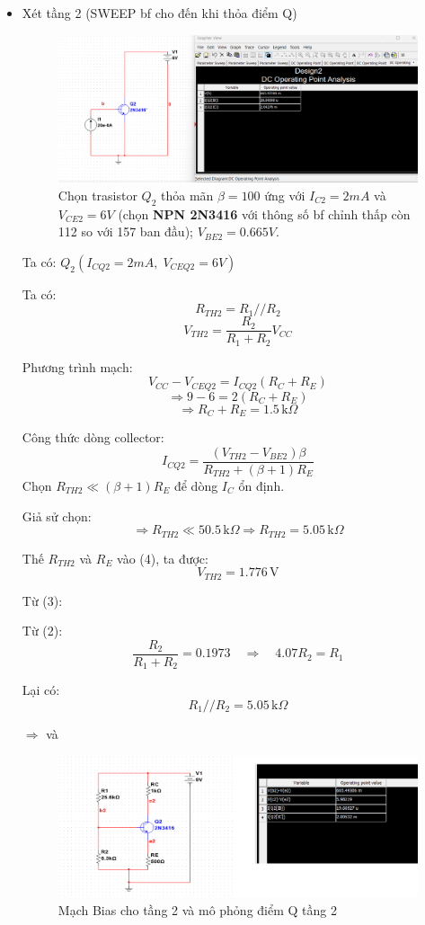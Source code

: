\begin{itemize}[label=-]
\item Xét tầng 2 (SWEEP bf cho đến khi thỏa điểm Q)

\begin{figure}[H]
	\centering
	\includegraphics[width=.8\linewidth]{./my-chapters/my-images/Question10/a_tang3.png}
	\caption{Chọn trasistor $Q_{2}$ thỏa mãn $\beta = 100$ ứng với $I_{C2} = 2 mA$ và $V_{CE2} = 6V$ (chọn \textbf{NPN 2N3416} với thông số bf chỉnh thấp còn 112 so với 157 ban đầu); $V_{BE2} =0.665V$.}
\end{figure}

\noindent Ta có: $Q_2( I_{CQ2} = 2{mA},\; V_{CEQ2} = 6{V})$

Ta có:
\[
R_{TH2} = R_1 // R_2 \tag{1}
\]
\[
V_{TH2} = \frac{R_2}{R_1 + R_2} V_{CC} \tag{2}
\]

Phương trình mạch:
\[
V_{CC} - V_{CEQ2} = I_{CQ2}(R_C + R_E)
\]
\[
\Rightarrow 9 - 6 = 2(R_C + R_E)
\]
\[
\Rightarrow R_C + R_E = 1.5\,\text{k}\Omega \tag{3}
\]

Công thức dòng collector:
\[
I_{CQ2} = \frac{(V_{TH2} - V_{BE2})\beta}{R_{TH2} + (\beta + 1)R_E} \tag{4}
\]
Chọn \( R_{TH2} \ll (\beta + 1)R_E \) để dòng \( I_C \) ổn định.  

Giả sử chọn: 
\[
\Rightarrow R_{TH2} \ll 50.5\,\text{k}\Omega \Rightarrow R_{TH2} = 5.05\,\text{k}\Omega
\]

Thế \( R_{TH2} \) và \( R_E \) vào (4), ta được:
\[
V_{TH2} = 1.776\,\text{V}
\]

Từ (3):


Từ (2):
\[
\frac{R_2}{R_1 + R_2} = 0.1973 \quad \Rightarrow \quad 4.07R_2 = R_1
\]

Lại có:
\[
R_1 // R_2 = 5.05\,\text{k}\Omega
\]

$\Rightarrow$  và 

\begin{figure}[H]
	\centering
	\includegraphics[width=.8\linewidth]{./my-chapters/my-images/Question10/a_tang4.png}
	\caption{Mạch Bias cho tầng 2 và mô phỏng điểm Q tầng 2}
\end{figure}

\end{itemize}

